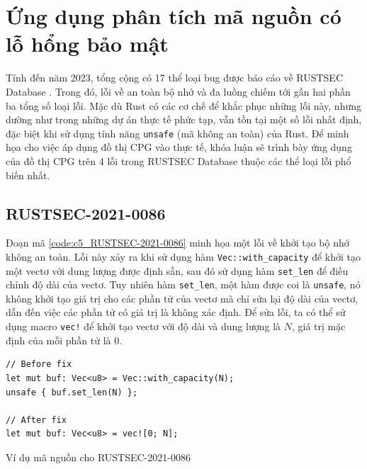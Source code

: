 \section{Ứng dụng phân tích mã nguồn có lỗ hổng bảo mật}

Tính đến năm 2023, tổng cộng có 17 thể loại bug được báo cáo về RUSTSEC Database \cite{zheng2023closer}.
Trong đó, lỗi về an toàn bộ nhớ và đa luồng chiếm tới gần hai phần ba tổng số loại lỗi.
Mặc dù Rust có các cơ chế để khắc phục những lỗi này, nhưng dường như trong những dự án thực tế phức tạp, vẫn tồn tại một số lỗi nhất định, đặc biệt khi sử dụng tính năng \texttt{unsafe} (mã không an toàn) của Rust.
Để minh họa cho việc áp dụng đồ thị CPG vào thực tế, khóa luận sẽ trình bày ứng dụng của đồ thị CPG trên 4 lỗi trong RUSTSEC Database thuộc các thể loại lỗi phổ biến nhất.

\subsection{RUSTSEC-2021-0086}

Đoạn mã \ref{code:c5_RUSTSEC-2021-0086} minh họa một lỗi về khởi tạo bộ nhớ không an toàn.
Lỗi này xảy ra khi sử dụng hàm \texttt{Vec::with\_capacity} để khởi tạo một vectơ với dung lượng được định sẵn, sau đó sử dụng hàm \texttt{set\_len} để điều chỉnh độ dài của vectơ.
Tuy nhiên hàm \texttt{set\_len}, một hàm được coi là \texttt{unsafe}, nó không khởi tạo giá trị cho các phần tử của vectơ mà chỉ sửa lại độ dài của vectơ, dẫn đến việc các phần tử có giá trị là không xác định.
Để sửa lỗi, ta có thể sử dụng macro \texttt{vec!} để khởi tạo vectơ với độ dài và dung lượng là $N$, giá trị mặc định của mỗi phần tử là $0$.

\begin{listing}[H]
\begin{verbatim}
// Before fix
let mut buf: Vec<u8> = Vec::with_capacity(N);
unsafe { buf.set_len(N) };

// After fix
let mut buf: Vec<u8> = vec![0; N];
\end{verbatim}
\caption{Ví dụ mã nguồn cho RUSTSEC-2021-0086}
\label{code:c5_RUSTSEC-2021-0086}
\end{listing}

